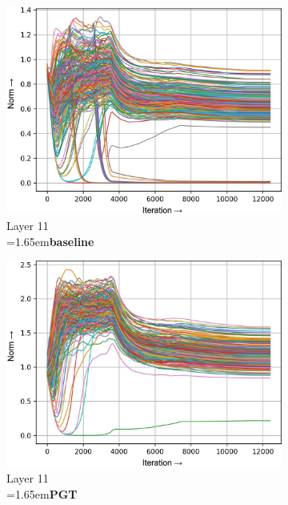 \documentclass[runningheads]{llncs}
\newcommand{\forceindentb}{\parindent=1.65em\indent\parindent=0pt\relax}
\begin{document}
\begin{figure}[t]
\centering
\captionsetup{font=footnotesize}

\begin{subfigure}[t]{0.16\textwidth}
\includegraphics[width=\textwidth]{trimmed/baseline-w-layer-4-2}
\caption{Layer 11\\ \forceindentb\textbf{baseline}}
\end{subfigure}
\begin{subfigure}[t]{0.16\textwidth}
\includegraphics[width=\textwidth]{trimmed/pgt-w-layer-4-2}
\caption{Layer 11\\ \forceindentb\textbf{PGT}}
\end{subfigure}
\begin{subfigure}[t]{0.16\textwidth}

\end{subfigure}
\end{figure}
\end{document}
